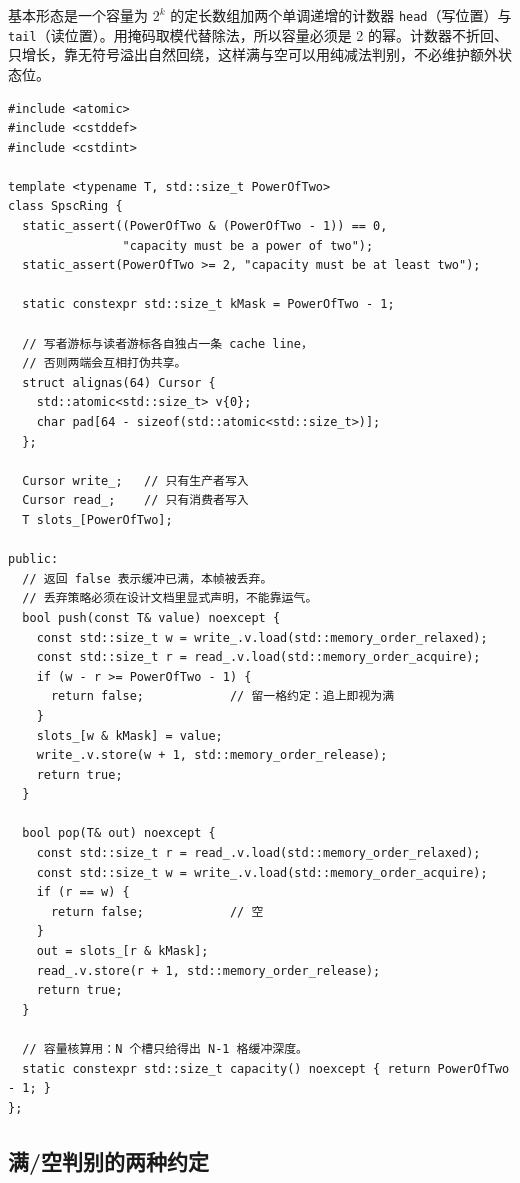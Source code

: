 \documentclass[12pt,a4paper,fontset=fandol]{ctexbook}
\newcommand{\Tp}[1]{\texttt{#1}}
\begin{document}
基本形态是一个容量为 $2^{k}$ 的定长数组加两个单调递增的计数器 \Tp{head}（写位置）与 \Tp{tail}（读位置）。用掩码取模代替除法，所以容量必须是 2 的幂。计数器不折回、只增长，靠无符号溢出自然回绕，这样满与空可以用纯减法判别，不必维护额外状态位。

\begin{lstlisting}[style=cppstyle,caption={C++：SPSC 无锁环形缓冲（定长槽）},label={lst:ch09-spsc}]
#include <atomic>
#include <cstddef>
#include <cstdint>

template <typename T, std::size_t PowerOfTwo>
class SpscRing {
  static_assert((PowerOfTwo & (PowerOfTwo - 1)) == 0,
                "capacity must be a power of two");
  static_assert(PowerOfTwo >= 2, "capacity must be at least two");

  static constexpr std::size_t kMask = PowerOfTwo - 1;

  // 写者游标与读者游标各自独占一条 cache line，
  // 否则两端会互相打伪共享。
  struct alignas(64) Cursor {
    std::atomic<std::size_t> v{0};
    char pad[64 - sizeof(std::atomic<std::size_t>)];
  };

  Cursor write_;   // 只有生产者写入
  Cursor read_;    // 只有消费者写入
  T slots_[PowerOfTwo];

public:
  // 返回 false 表示缓冲已满，本帧被丢弃。
  // 丢弃策略必须在设计文档里显式声明，不能靠运气。
  bool push(const T& value) noexcept {
    const std::size_t w = write_.v.load(std::memory_order_relaxed);
    const std::size_t r = read_.v.load(std::memory_order_acquire);
    if (w - r >= PowerOfTwo - 1) {
      return false;            // 留一格约定：追上即视为满
    }
    slots_[w & kMask] = value;
    write_.v.store(w + 1, std::memory_order_release);
    return true;
  }

  bool pop(T& out) noexcept {
    const std::size_t r = read_.v.load(std::memory_order_relaxed);
    const std::size_t w = write_.v.load(std::memory_order_acquire);
    if (r == w) {
      return false;            // 空
    }
    out = slots_[r & kMask];
    read_.v.store(r + 1, std::memory_order_release);
    return true;
  }

  // 容量核算用：N 个槽只给得出 N-1 格缓冲深度。
  static constexpr std::size_t capacity() noexcept { return PowerOfTwo - 1; }
};
\end{lstlisting}

\subsection*{满/空判别的两种约定}
\end{document}
